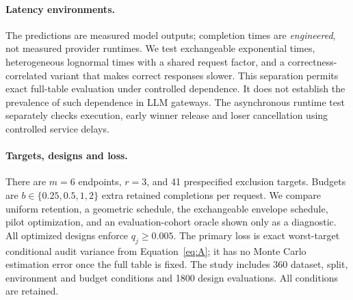 \documentclass[12pt]{clear2027}
\begin{document}
\paragraph{Latency environments.}
The predictions are measured model outputs; completion times are \emph{engineered}, not measured provider runtimes. We test exchangeable exponential times, heterogeneous lognormal times with a shared request factor, and a correctness-correlated variant that makes correct responses slower. This separation permits exact full-table evaluation under controlled dependence. It does not establish the prevalence of such dependence in LLM gateways. The asynchronous runtime test separately checks execution, early winner release and loser cancellation using controlled service delays.

\paragraph{Targets, designs and loss.}
There are $m=6$ endpoints, $r=3$, and 41 prespecified exclusion targets. Budgets are $b\in\{0.25,0.5,1,2\}$ extra retained completions per request. We compare uniform retention, a geometric schedule, the exchangeable envelope schedule, pilot optimization, and an evaluation-cohort oracle shown only as a diagnostic. All optimized designs enforce $q_j\ge0.005$. The primary loss is exact worst-target conditional audit variance from Equation~\eqref{eq:A}; it has no Monte Carlo estimation error once the full table is fixed. The study includes 360 dataset, split, environment and budget conditions and 1800 design evaluations. All conditions are retained.
\end{document}
